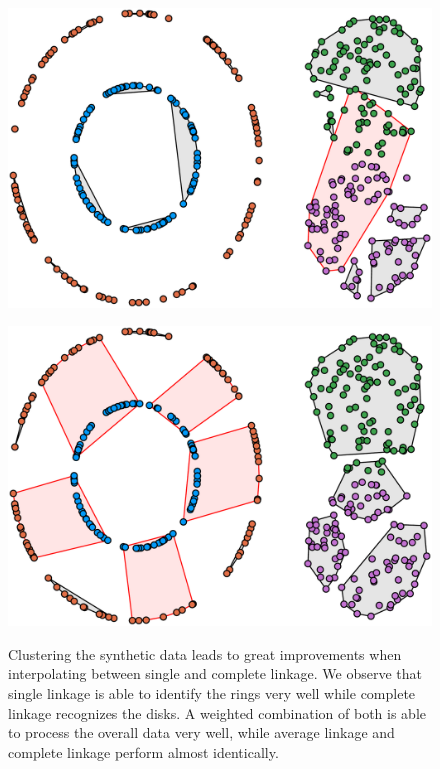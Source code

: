 \begin{figure}[H]
\begin{minipage}{.45\textwidth}
\end{minipage}
\begin{minipage}{.45\textwidth}
  \centering
  {\includegraphics[width=\linewidth]{plots/single_linkage_370}}
\end{minipage}\qquad
\begin{minipage}{.45\textwidth}
  \centering
  {\includegraphics[width=\linewidth]{plots/complete_linkage_389}}
\end{minipage}
\caption{%
  Clustering the synthetic data leads to great improvements when interpolating between single and complete linkage. We observe that single linkage is able to identify the rings very well while complete linkage recognizes the disks. A weighted combination of both is able to process the overall data very well, while average linkage and complete linkage perform almost identically.
  }
\label{fig:syntheticexperiments}
\end{figure}

